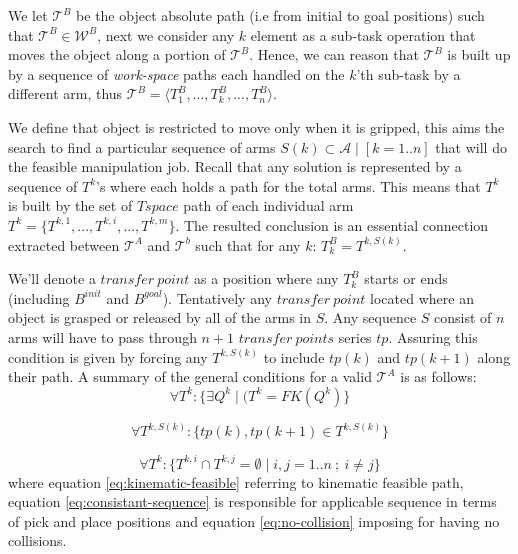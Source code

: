 We let $\mathcal{T}^B$ be the object absolute path (i.e from initial to goal positions) such that $\mathcal{T}^B \in \mathcal{W}^B$, next we consider any $k$ element as a sub-task operation that moves the object along a portion of $\mathcal{T}^B$. Hence, we can reason that $\mathcal{T}^B$ is built up by a sequence of \textit{work-space} paths each handled on the $k$'th sub-task by a different arm, thus $\mathcal{T}^B = \langle T^B_1,...,T^B_k,...,T^B_n \rangle $. 

We define that object is restricted to move only when it is gripped, this aims the search 
to find a particular sequence of arms $S(k) \subset \mathcal{A} \mid [k=1..n] $ that will do the feasible manipulation job. Recall that any solution is represented by a sequence of $T^k$'s where each holds a path for the total arms. This means that $T^k$ is built by the set of $Tspace$ path of each individual arm $T^k = \{ T^{k,1},...,T^{k,i},...,T^{k,m} \}$. The resulted conclusion is an essential connection extracted between $\mathcal{T}^A$ and $\mathcal{T}^b$ such that for any $k$: $T^B_k = T^{k,S(k)}$.

We'll denote a $transfer~point$ as a position where any $T^B_k$ starts or ends (including $B^{init}$ and $B^{goal}$). Tentatively any $transfer~point$ located where an object is grasped or released by all of the arms in $S$. Any sequence $S$ consist of $n$ arms will have to pass through $n+1$ $transfer~points$ series $tp$. Assuring this condition is given by forcing any $T^{k,S(k)}$ to include $tp(k)$ and $tp(k+1)$ along their path. A summary of the general conditions for a valid $\mathcal{T}^A$ is as follows:
\begin{equation}
\label{eq:kinematic-feasible}
        \forall T^{k}: \{\exists Q^{k} \mid (T^{k} = FK(Q^{k})\} 
\end{equation}

\begin{equation}
\label{eq:consistant-sequence}
        \forall T^{k,S(k)}: \{ tp(k),tp(k+1) \in T^{k,S(k)}  \}
\end{equation}

\begin{equation}
\label{eq:no-collision}
        \forall T^{k}: \{ T^{k,i} \cap T^{k,j} = \emptyset \mid i,j=1..n~;~i\neq j \}
\end{equation}
where equation \ref{eq:kinematic-feasible} referring to kinematic feasible path, equation \ref{eq:consistant-sequence} is responsible for applicable sequence in terms of pick and place positions and equation \ref{eq:no-collision} imposing for having no collisions.





